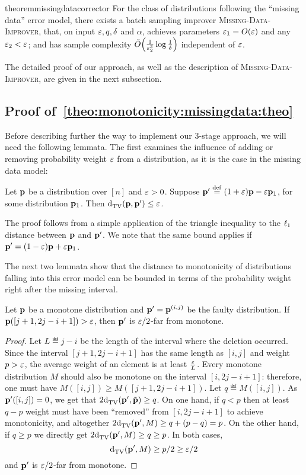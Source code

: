 \begin{restatable}{theorem}{missingdatacorrector}\label{theo:monotonicity:missingdata:theo}
For the class of distributions following the ``missing data'' error model, there exists a batch sampling improver \textsc{Missing-Data-Improver}, that, on input $\eps,q,\delta$ and $\alpha$, achieves parameters $\eps_1=\bigO{\eps}$ and any $\eps_2 < \eps$; and has sample complexity $\tildeO{\frac{1}{\eps_2^{3}}\log\frac{1}{\delta}}$ independent of $\eps$. 
\end{restatable}
\noindent The detailed proof of our approach, as well as the description of \textsc{Missing-Data-Improver}, are given in the next subsection.
  
\subsection{Proof of~\cref{theo:monotonicity:missingdata:theo}}
Before describing further the way to implement our 3-stage approach, we will need the following lemmata. The first examines the influence of adding or removing probability weight $\eps$ from a distribution, as it is the case in the missing data model:
\begin{lemma}\label{lemma:error:add}
Let $\D$ be a distribution over $[n]$ and $\eps>0$. Suppose $\D^\prime\eqdef(1+\eps) \D - \eps \D_1$, for some distribution $\D_1$. Then $\totalvardist{\D}{\D^\prime} \leq \eps$. 
\end{lemma}
\noindent The proof follows from a simple application of the triangle inequality to the $\lp[1]$ distance between $\D$ and $\D^\prime$. We note that the same bound applies if $\D^\prime=(1-\eps)\D+\eps \D_1$.\medskip

The next two lemmata show that the distance to monotonicity of distributions falling into this error model can be bounded in terms of the probability weight right after the missing interval.
\begin{lemma}\label{lemma:consec:intervals:far}
Let $\D$ be a monotone distribution and $\D^\prime=\D^{(i,j)}$ be the faulty distribution. If $\D([j+1,2j-i+1])>\eps$, then $\D^\prime$ is $\eps/2$-far from monotone.
\end{lemma}
\begin{proof}
    Let $L\eqdef j-i$ be the length of the interval where the deletion occurred. 
    Since the interval $[j+1,2j-i+1]$ has the same length as $[i,j]$ and weight $p > \eps$, the average weight of an element is at least $\frac{\eps}{L}$. 
    Every monotone distribution $M$ should also be monotone on the interval $[i,2j-i+1]$: therefore, one must have $M([i,j])\geq M([j+1,2j-i+1])$. Let $q\eqdef M([i,j])$. As $\D^\prime([i,j])=0$, we get that $2\totalvardist{\D^\prime}{\tilde{\D}}\geq q$. On one hand, if $q < p$ then at least $q-p$ weight must have been ``removed'' from $[i,2j-i+1]$ to achieve monotonicity, and altogether $2\totalvardist{\D^\prime}{M}\geq q+(p-q)=p$. On the other hand, if $q \geq p$ we directly get $2\totalvardist{\D^\prime}{M}\geq q\geq p$. In both cases, \[
    \totalvardist{\D^\prime}{M}\geq p/2\geq \eps/2
    \]
    and $\D^\prime$ is $\eps/2$-far from monotone.
\end{proof}

